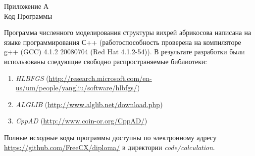 \label{ch:A}
\begin{center}
    Приложение А\\
    Код Программы
\end{center}

Программа численного моделирования структуры вихрей абрикосова написана на 
языке программирования С++ (работоспособность проверена на компиляторе g++ 
(GCC) 4.1.2 20080704 (Red Hat 4.1.2-54)). В результате разработки были 
использованы следующие свободно распространяемые библиотеки:
\begin{enumerate}
    \item \emph{HLBFGS}
(\url{http://research.microsoft.com/en-us/um/people/yangliu/software/hlbfgs/})
    \item \emph{ALGLIB} (\url{http://www.alglib.net/download.php})
    \item \emph{CppAD} (\url{http://www.coin-or.org/CppAD/})
\end{enumerate}

Полные исходные коды программы доступны по электронному адресу 
\url{https://github.com/FreeCX/diploma/} в директории \emph{code/calculation}.

\newpage

